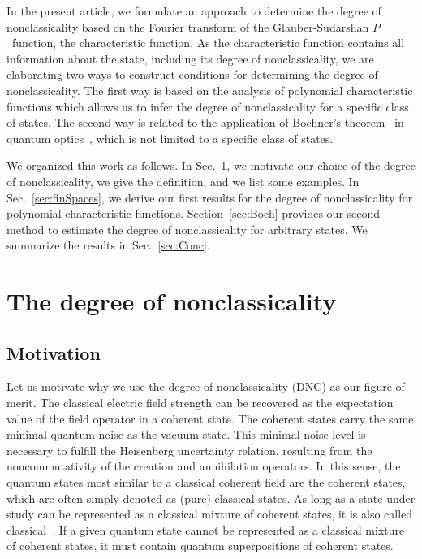 \documentclass[aps,pra,twocolumn,showpacs,superscriptaddress,10pt]{revtex4-1}
\begin{document}
	In the present article, we formulate an approach to determine the degree of nonclassicality based on the Fourier transform of the Glauber-Sudarshan $P$~function, the characteristic function.
	As the characteristic function contains all information about the state, including its degree of nonclassicality, we are elaborating two ways to construct conditions for determining the degree of nonclassicality.
	The first way is based on the analysis of polynomial characteristic functions which allows us to infer the degree of nonclassicality for a specific class of states.
	The second way is related to the application of Bochner's theorem~\cite{Bochner1933} in quantum optics~\cite{Vogel2000,Richter2002}, which is not limited to a specific class of states.

	We organized this work as follows.
	In Sec.~\ref{sec:doN}, we motivate our choice of the degree of nonclassicality, we give the definition, and we list some examples.
	In Sec.~\ref{sec:finSpaces}, we derive our first results for the degree of nonclassicality for polynomial characteristic functions.
	Section~\ref{sec:Boch} provides our second method to estimate the degree of nonclassicality for arbitrary states.
	We summarize the results in Sec.~\ref{sec:Conc}.

\section{The degree of nonclassicality}\label{sec:doN}

\subsection{Motivation}
	Let us motivate why we use the degree of nonclassicality (DNC) as our figure of merit.
	The classical electric field strength can be recovered as the expectation value of the field operator in a coherent state.
	The coherent states carry the same minimal quantum noise as the vacuum state.
	This minimal noise level is necessary to fulfill the Heisenberg uncertainty relation, resulting from the noncommutativity of the creation and annihilation operators.
	In this sense, the quantum states most similar to a classical coherent field are the coherent states, which are often simply denoted as (pure) classical states.
	As long as a state under study can be represented as a classical mixture of coherent states, it is also called classical~\cite{Titulaer1965,Mandel1986}.
	If a given quantum state cannot be represented as a classical mixture of coherent states, it must contain quantum superpositions of coherent states.
\end{document}
